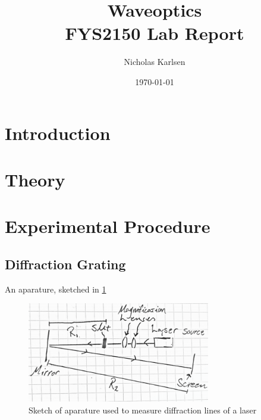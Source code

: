 \documentclass[11pt,a4paper]{article}
\begin{document}

\title{Waveoptics\\
\normalsize{FYS2150 Lab Report}}

\author{Nicholas Karlsen}

\date{\today}%

\maketitle

\begin{abstract}
\end{abstract}


\section{\label{sect:intro}Introduction}

\section{\label{sect:theory}Theory}

\section{\label{section:experimental}Experimental Procedure} 
    \subsection{Diffraction Grating}

    An aparature, sketched in \ref{fig:laser}

    \begin{figure}[H]
        \center
        \includegraphics[width=8cm]{scripts/figs/diff_diagram.png}
        \caption{Sketch of aparature used to measure diffraction lines of a laser}
        \label{fig:laser}
    \end{figure}
\end{document}
